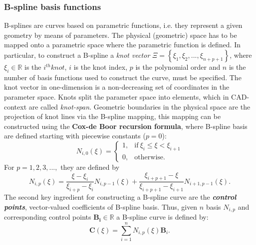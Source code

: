 \documentclass[3p]{article}
\begin{document}
\subsubsection*{B-spline basis functions}
B-splines are curves based on parametric functions, i.e. they represent a given geometry by means of parameters. The physical (geometric) space has to be mapped onto a parametric space where the parametric function is defined. In particular, to construct a B-spline a \textit{knot vector} $\Xi=\left\lbrace\xi_{1},\xi_{2},...,\xi_{n+p+1}\right\rbrace$, where $\xi_{i} \in \mathbb{R}$ is the $i^{th} knot$, $i$ is the knot index, $p$ is the polynomial order and $n$ is the number of basis functions used to construct the curve, must be specified. The knot vector in one-dimension is a non-decreasing set of coordinates in the parameter space. Knots split the parameter space into elements, which in CAD-context are called \textit{knot-span}. Geometric boundaries in the physical space are the projection of knot lines via the B-spline mapping, this mapping can be constructed using the \textbf{Cox-de Boor recursion formula}, where B-spline basis are defined starting with piecewise constants ($p=0$):
\begin{equation}
N_{i,0}(\xi)= 
\begin{cases}
      1, & \text{if}\ \xi_{i} \leqslant \xi < \xi_{i+1} \\
      0, & \text{otherwise}.
\end{cases}
\end{equation}
For $p=1,2,3,...,$ they are defined by
\begin{equation}
N_{i,p}(\xi) = \dfrac{\xi-\xi_{i}}{\xi_{i+p}-\xi_{i}}N_{i,p-1}(\xi)+\dfrac{\xi_{i+p+1}-\xi}{\xi_{i+p+1}-\xi_{i+1}}N_{i+1,p-1}(\xi).
\end{equation}
The second key ingredient for constructing a B-spline curve are the \textbf{\textit{control points}}, vector-valued coefficients of B-spline basis. Thus, given $n$ basis $N_{i,p}$ and corresponding control points $\mathbf{B_{i}}\in\mathbb{R}$ a B-spline curve is defined by:
\begin{equation}
\mathbf{C}(\xi) = \sum_{i=1}^{n}N_{i,p}(\xi)\mathbf{B}_{i}.
\end{equation}
\end{document}
